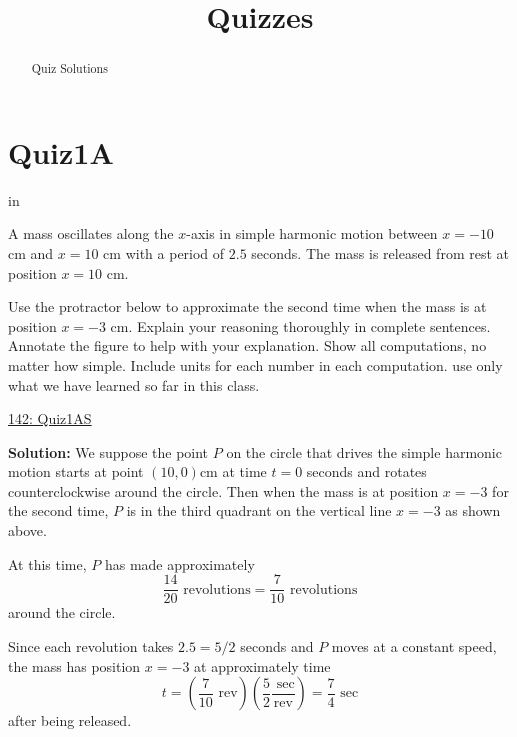 \documentclass{ximera}
\title{Quizzes}
\newcommand{\pskip}{\vskip 0.1 in}
\begin{document}
\begin{abstract}
Quiz Solutions
\end{abstract}
\maketitle

\section{Quiz1A}

\pskip



A mass oscillates along the $x$-axis in simple harmonic motion between $x=-10$ cm and $x=10$ cm with a period of $2.5$ seconds. The mass is released from rest at position $x=10$ cm.

Use the protractor below to approximate the second time when the mass is at position $x=-3$ cm. Explain your reasoning thoroughly in complete sentences. Annotate the figure to help with your explanation. Show all computations, no matter how simple. Include units for each number in each computation. use only what we have learned so far in this class.

\begin{onlineOnly}
    \begin{center}
\end{center}
\end{onlineOnly}

\href{https://www.desmos.com/calculator/5fuh8n6ef1}{142: Quiz1AS}


{\bf Solution:} We suppose the point $P$ on the circle that drives the simple harmonic motion starts at point $(10,0)$cm at time $t=0$ seconds and rotates counterclockwise around the circle. Then when the mass is at position $x=-3$ for the second time, $P$ is in the third quadrant on the vertical line $x=-3$ as shown above.

At this time, $P$ has made approximately
\[
     \frac{14}{20}\text{ revolutions} = \frac{7}{10} \text{ revolutions}
\]
around the circle. 

Since each revolution takes $2.5 = 5/2$ seconds and $P$ moves at a constant speed, the mass has position $x=-3$ at approximately time
\[
 t = \left( \frac{7}{10} \text{ rev}  \right) \left(\frac{5}{2} \frac{\text{ sec}}{\text{rev}}  \right) = \frac{7}{4} \text{ sec}
\]
after being released.
\end{document}
